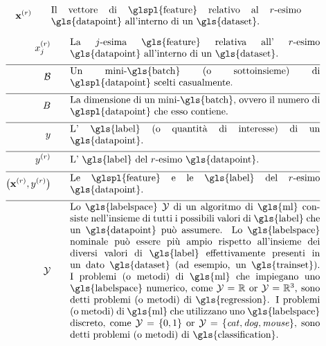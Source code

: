 \begin{align}
	\featurevec^{(\sampleidx)} \quad\quad &\parbox{.75\textwidth}{Il vettore di \glspl{feature} relativo al $\sampleidx$-esimo \gls{datapoint} all'interno di un \gls{dataset}. } \nonumber %
\end{align}        


\begin{align}
	\feature_{\featureidx}^{(\sampleidx)}\quad\quad &\parbox{.75\textwidth}{La $\featureidx$-esima \gls{feature} relativa all' $\sampleidx$-esimo 
		\gls{datapoint} all'interno di un \gls{dataset}.} \nonumber \\[2mm] \hline \nonumber\\[-5mm]
	\batch \quad\quad &\parbox{.75\textwidth}{Un mini-\gls{batch} (o sottoinsieme) di \glspl{datapoint} scelti casualmente.}\nonumber \\[2mm] \hline \nonumber\\[-5mm]
	\batchsize \quad\quad &\parbox{.75\textwidth}{La dimensione di un mini-\gls{batch}, ovvero il numero di \glspl{datapoint} che esso contiene.}\nonumber \\[2mm] \hline \nonumber\\[-5mm]
	\truelabel \quad\quad &\parbox{.75\textwidth}{L' \gls{label} (o quantità di interesse) di un \gls{datapoint}.} \nonumber \\[2mm] \hline \nonumber\\[-5mm]
	\truelabel^{(\sampleidx)} \quad\quad &\parbox{.75\textwidth}{L' \gls{label} del $\sampleidx$-esimo \gls{datapoint}.} \nonumber \\[2mm] \hline \nonumber\\[-5mm]
	\big(\featurevec^{(\sampleidx)},\truelabel^{(\sampleidx)}\big)  \quad\quad &\parbox{.75\textwidth}{Le \glspl{feature} e le \gls{label} del $\sampleidx$-esimo \gls{datapoint}.}\nonumber \\[2mm] \hline \nonumber\\[-5mm]
	\labelspace  \quad\quad & \parbox{.75\textwidth}{Lo \gls{labelspace} $\labelspace$ di un algoritmo di \gls{ml} consiste nell’insieme di tutti i possibili valori di \gls{label} che un \gls{datapoint} può assumere. Lo \gls{labelspace} nominale può essere più ampio rispetto all’insieme dei diversi valori di \gls{label} effettivamente presenti in un dato \gls{dataset} (ad esempio, un \gls{trainset}). I problemi (o metodi) di \gls{ml} che impiegano uno \gls{labelspace} numerico, come $\labelspace=\mathbb{R}$ 
		or $\labelspace=\mathbb{R}^{3}$, sono detti problemi (o metodi) di \gls{regression}. I problemi (o metodi) di \gls{ml} che utilizzano uno \gls{labelspace} discreto, come $\labelspace=\{0,1\}$ or $\labelspace=\{\mbox{\emph{cat}},\mbox{\emph{dog}},\mbox{\emph{mouse}}\}$, 
		sono detti problemi (o metodi) di \gls{classification}.}  \nonumber %
\end{align}                  


